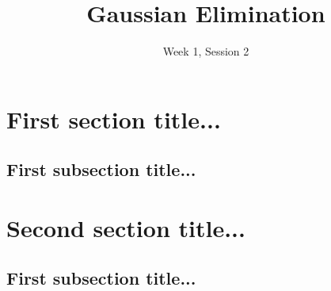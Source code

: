 \documentclass[11pt]{exam}
\title{Gaussian Elimination}
\date{Week 1, Session 2}
\begin{document}
\maketitle

\section{First section title...}
    
    \vspace{10px}
    \subsection{First subsection title...}

\pagebreak
\section{Second section title...}
    
    \vspace{10px}
    \subsection{First subsection title...}
\end{document}
